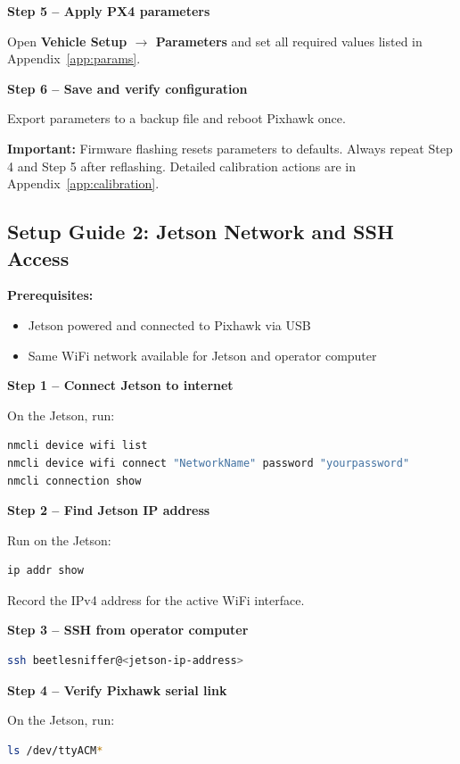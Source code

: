 \documentclass{article}
\begin{document}
\textbf{Step 5 -- Apply PX4 parameters}

Open \textbf{Vehicle Setup $\rightarrow$ Parameters} and set all required values listed in Appendix~\ref{app:params}.


\textbf{Step 6 -- Save and verify configuration}

Export parameters to a backup file and reboot Pixhawk once.


\textbf{Important:} Firmware flashing resets parameters to defaults. Always repeat Step 4 and Step 5 after reflashing. Detailed calibration actions are in Appendix~\ref{app:calibration}.

\subsection{Setup Guide 2: Jetson Network and SSH Access}
\label{sec:ssh}

\textbf{Prerequisites:}
\begin{itemize}
    \item Jetson powered and connected to Pixhawk via USB
    \item Same WiFi network available for Jetson and operator computer
\end{itemize}

\textbf{Step 1 -- Connect Jetson to internet}

On the Jetson, run:
\begin{lstlisting}[language=bash]
nmcli device wifi list
nmcli device wifi connect "NetworkName" password "yourpassword"
nmcli connection show
\end{lstlisting}


\textbf{Step 2 -- Find Jetson IP address}

Run on the Jetson:
\begin{lstlisting}[language=bash]
ip addr show
\end{lstlisting}

Record the IPv4 address for the active WiFi interface.


\textbf{Step 3 -- SSH from operator computer}

\begin{lstlisting}[language=bash]
ssh beetlesniffer@<jetson-ip-address>
\end{lstlisting}


\textbf{Step 4 -- Verify Pixhawk serial link}

On the Jetson, run:
\begin{lstlisting}[language=bash]
ls /dev/ttyACM*
\end{lstlisting}
\end{document}
